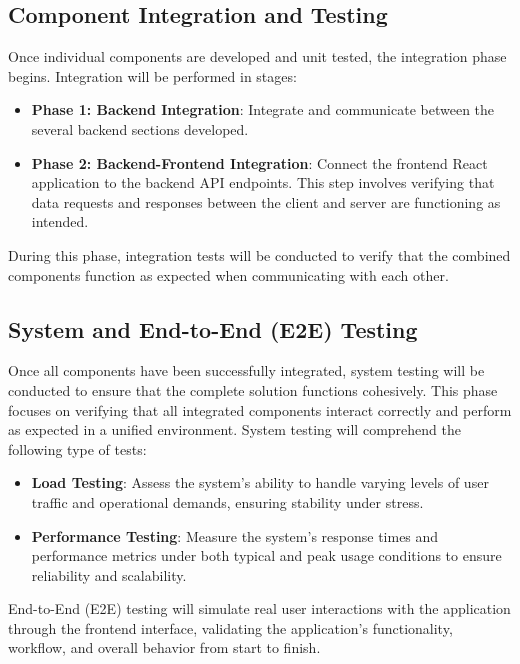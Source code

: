 \subsection{Component Integration and Testing}

Once individual components are developed and unit tested, the integration phase begins. Integration will be performed in stages:

\begin{itemize}
    \item \textbf{Phase 1: Backend Integration}: Integrate and communicate between the several backend sections developed.
    \item \textbf{Phase 2: Backend-Frontend Integration}: Connect the frontend React application to the backend API endpoints. This step involves verifying that data requests and responses between the client and server are functioning as intended.
\end{itemize}

During this phase, integration tests will be conducted to verify that the combined components function as expected when communicating with each other.

\subsection{System and End-to-End (E2E) Testing}

Once all components have been successfully integrated, system testing will be conducted to ensure that the complete solution functions cohesively. This phase focuses on verifying that all integrated components interact correctly and perform as expected in a unified environment. System testing will comprehend the following type of tests:

\begin{itemize}
\item \textbf{Load Testing}: Assess the system's ability to handle varying levels of user traffic and operational demands, ensuring stability under stress. \item \textbf{Performance Testing}: Measure the system's response times and performance metrics under both typical and peak usage conditions to ensure reliability and scalability.
\end{itemize}

End-to-End (E2E) testing will simulate real user interactions with the application through the frontend interface, validating the application's functionality, workflow, and overall behavior from start to finish.



